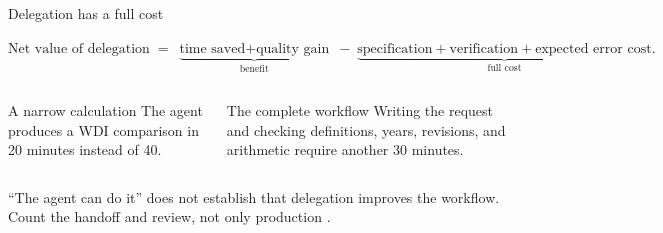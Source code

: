 \begin{frame}{Delegation has a full cost}
  \begin{center}
    \large
    $\text{Net value of delegation}
    \;=\;
    \underbrace{\text{time saved}+\text{quality gain}}_{\text{benefit}}
    \;-\;
    \underbrace{\text{specification}+\text{verification}
      +\text{expected error cost}}_{\text{full cost}}.$
  \end{center}

  \vspace{0.65em}
  \begin{columns}[T,onlytextwidth]
      \begin{block}{A narrow calculation}
        The agent produces a WDI comparison in 20 minutes instead of 40.
      \end{block}
      \begin{block}{The complete workflow}
        Writing the request and checking definitions, years, revisions, and
        arithmetic require another 30 minutes.
      \end{block}
  \end{columns}

  \vfill
  ``The agent can do it'' does not establish that delegation improves the
  workflow. Count the handoff and review, not only production
  \citep{coase1937firm}.
\end{frame}

